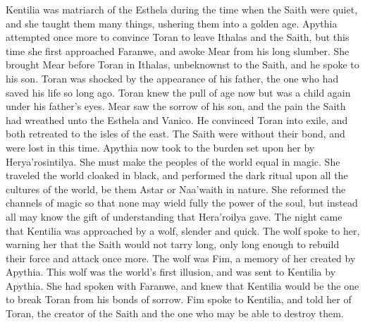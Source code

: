 \documentclass[smalldemyvopaper,11pt,twoside,onecolumn,openright,extrafontsizes]{memoir}
\begin{document}
Kentilia was matriarch of the Esthela during the time when the Saith were quiet, and she taught them many things, ushering them into a golden age.
Apythia attempted once more to convince Toran to leave Ithalas and the Saith, but this time she first approached Faranwe, and awoke Mear from his long slumber. She brought Mear before Toran in Ithalas, unbeknownst to the Saith, and he spoke to his son. Toran was shocked by the appearance of his father, the one who had saved his life so long ago. Toran knew the pull of age now but was a child again under his father’s eyes. Mear saw the sorrow of his son, and the pain the Saith had wreathed unto the Esthela and Vanico. He convinced Toran into exile, and both retreated to the isles of the east. The Saith were without their bond, and were lost in this time. Apythia now took to the burden set upon her by Herya’rosintilya. She must make the peoples of the world equal in magic. She traveled the world cloaked in black, and performed the dark ritual upon all the cultures of the world, be them Astar or Naa’waith in nature. She reformed the channels of magic so that none may wield fully the power of the soul, but instead all may know the gift of understanding that Hera’roilya gave. 
The night came that Kentilia was approached by a wolf, slender and quick. The wolf spoke to her, warning her that the Saith would not tarry long, only long enough to rebuild their force and attack once more. The wolf was Fim, a memory of her created by Apythia. This wolf was the world’s first illusion, and was sent to Kentilia by Apythia. She had spoken with Faranwe, and knew that Kentilia would be the one to break Toran from his bonds of sorrow. Fim spoke to Kentilia, and told her of Toran, the creator of the Saith and the one who may be able to destroy them.
\end{document}
